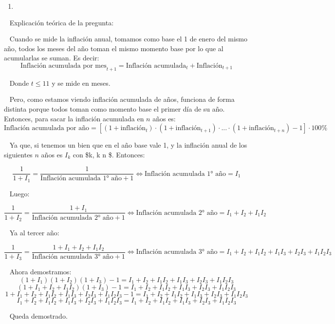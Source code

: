 \documentclass[
  letterpaper,
  DIV=11,
  numbers=noendperiod]{scrreport}
\providecommand{\tightlist}{%
  \setlength{\itemsep}{0pt}\setlength{\parskip}{0pt}}\usepackage{longtable,booktabs,array}
\begin{document}
\hfill\break

\begin{enumerate}
\def\labelenumi{\arabic{enumi})}
\setcounter{enumi}{1}
\tightlist
\item
\end{enumerate}

\hfill\break

~ Explicación teórica de la pregunta:

\hfill\break

~ Cuando se mide la inflación anual, tomamos como base el 1 de enero del
mismo año, todos los meses del año toman el mismo momento base por lo
que al acumularlas se suman. Es decir: \[
\text{Inflación acumulada por mes}_{t+1}=\text{Inflación acumulada}_{t}+\text{Inflación}_{t+1}
\]

~ Donde \(t\leq 11\) y se mide en meses.

~ Pero, como estamos viendo inflación acumulada de años, funciona de
forma distinta porque todos toman como momento base el primer día de su
año. Entonces, para sacar la inflación acumulada en \(n\) años es: \[
\text{Inflación acumulada por año}=\left[(1+\text{inflación}_t)\cdot(1+\text{inflación}_{t+1})\cdot ... \cdot (1+\text{inflación}_{t+n})-1\right]\cdot 100\%
\]

~ Ya que, si tenemos un bien que en el año base vale 1, y la inflación
anual de los siguientes \(n\) años es \(I_k\) con \$k\in {}, k
\leq n \$. Entonces:

\[
\frac{1}{1+I_1}=\frac{1}{\text{Inflación acumulada 1° año}+1} \Leftrightarrow \text{Inflación acumulada 1° año}=I_1
\]

~ Luego:

\[
\frac{1}{1+I_2}=\frac{1+I_1}{\text{Inflación acumulada 2° año}+1} \Leftrightarrow \text{Inflación acumulada 2° año}=I_1+I_2+I_1I_2
\]

~ Ya al tercer año:

\[
\frac{1}{1+I_3}=\frac{1+I_1+I_2+I_1I_2}{\text{Inflación acumulada 3° año}+1} \Leftrightarrow \text{Inflación acumulada 3° año}=I_1+I_2+I_1I_2+I_1I_3+I_2I_3+I_1I_2I_3
\]

~ Ahora demostramos: \[
(1+I_1)(1+I_2)(1+I_3)-1=I_1+I_2+I_1I_2+I_1I_3+I_2I_3+I_1I_2I_3
\] \[
(1+I_1+I_2+I_1I_2)(1+I_3)-1=I_1+I_2+I_1I_2+I_1I_3+I_2I_3+I_1I_2I_3
\] \[
1+I_1+I_2+I_1I_2+I_1I_3+I_2I_3+I_1I_2I_3-1=I_1+I_2+I_1I_2+I_1I_3+I_2I_3+I_1I_2I_3
\] \[
I_1+I_2+I_1I_2+I_1I_3+I_2I_3+I_1I_2I_3=I_1+I_2+I_1I_2+I_1I_3+I_2I_3+I_1I_2I_3
\]

~ Queda demostrado.
\end{document}
